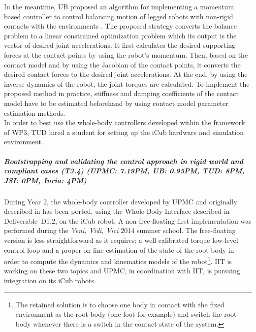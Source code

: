 In the meantime, UB proposed an algorithm for implementing a momentum
based controller to control balancing motion of legged robots with non-rigid
contacts with the environments \cite{Azad&Mistry15}.  The proposed strategy
converts the balance problem to a linear constrained optimization problem
which its output is the vector of desired joint accelerations.  It first
calculates the desired supporting forces at the contact points by using the
robot’s momentum.  Then, based on the contact model and by using the Jacobian
of the contact points, it converts the desired contact forces to the desired
joint accelerations.  At the end, by using the inverse dynamics of the robot,
the joint torques are calculated.  To implement the proposed method in
practice, stiffness and damping coefficients of the contact model have to be
estimated beforehand by using contact model parameter estimation methods.\\
    
In order to best use the whole-body controllers developed within the framework of WP3, TUD hired a student for setting up the iCub hardware and simulation environment.


\subparagraph{Bootstrapping and validating the control approach in rigid world and compliant cases (T3.4) (UPMC: 7.19PM, UB: 0.95PM, TUD: 8PM, JSI: 0PM, Inria: 4PM)}

During Year 2, the whole-body controller developed by UPMC and originally described in \cite{salini2012} has been ported, using the Whole Body Interface described in Deliverable~D1.2, on the iCub robot. A non-free-floating first implementation was performed during the \textit{Veni, Vidi, Vici} 2014 summer school. The free-floating version is less straightforward as it requires: a well calibrated torque low-level control loop and a proper on-line estimation of the state of the root-body in order to  compute the dynamics and kinematics models of the robot\footnote{The retained solution is to choose one body in contact with the fixed environment as the root-body (one foot for example) and switch the root-body whenever there is a switch in the contact state of the system.}. IIT is working on these two topics and UPMC, in coordination with IIT, is pursuing integration on its iCub robots.

